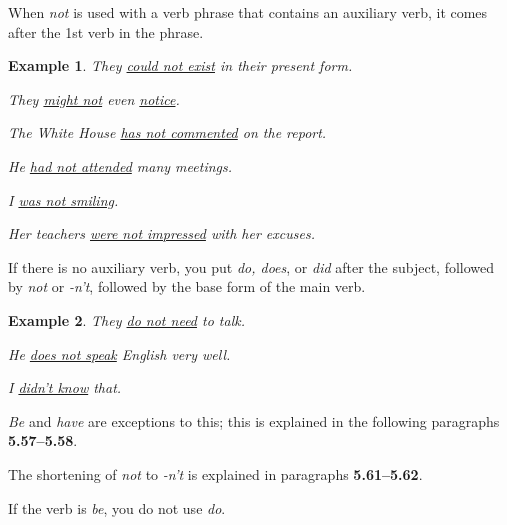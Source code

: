 \documentclass[oneside]{book}
\numberwithin{equation}{section}
\newtheorem{example}{Example}[section]
\begin{document}
%
\noindent{} When \textit{not} is used with a verb phrase that contains an auxiliary verb, it comes after the 1st verb in the phrase.
\begin{example}
    They \underline{could not exist} in their present form.
    
    They \underline{might not} even \underline{notice}.
    
    The White House \underline{has not commented} on the report.
    
    He \underline{had not attended} many meetings.
    
    I \underline{was not smiling}.
    
    Her teachers \underline{were not impressed} with her excuses.
\end{example}
%
\noindent{} If there is no auxiliary verb, you put \textit{do, does}, or \textit{did} after the subject, followed by \textit{not} or \textit{-n't}, followed by the base form of the main verb.
\begin{example}
    They \underline{do not need} to talk.
    
    He \underline{does not speak} English very well.
    
    I \underline{didn't know} that.
\end{example}
\textit{Be} and \textit{have} are exceptions to this; this is explained in the following paragraphs \textbf{5.57--5.58}.

The shortening of \textit{not} to \textit{-n't} is explained in paragraphs \textbf{5.61--5.62}.

%
\noindent{} If the verb is \textit{be}, you do not use \textit{do}.
\end{document}
